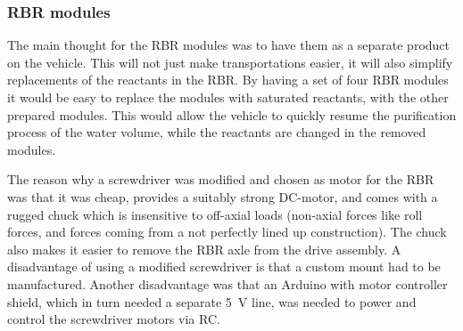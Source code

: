 
\subsubsection{RBR modules}

The main thought for the RBR modules was to have them as a separate product on the vehicle. This will not just make transportations easier, it will also simplify replacements of the reactants in the RBR. By having a set of four RBR modules it would be easy to replace the modules with saturated reactants, with the other prepared modules. This would allow the vehicle to quickly resume the purification process of the water volume, while the reactants are changed in the removed modules. %

The reason why a screwdriver was modified and chosen as motor for the RBR was that it was cheap, provides a suitably strong DC-motor, and comes with a rugged chuck which is insensitive to off-axial loads (non-axial forces like roll forces, and forces coming from a not perfectly lined up construction). The chuck also makes it easier to remove the RBR axle from the drive assembly. A disadvantage of using a modified screwdriver is that a custom mount had to be manufactured. Another disadvantage was that an Arduino with motor controller shield, which in turn needed a separate 5~V line, was needed to power and control the screwdriver motors via RC. %





